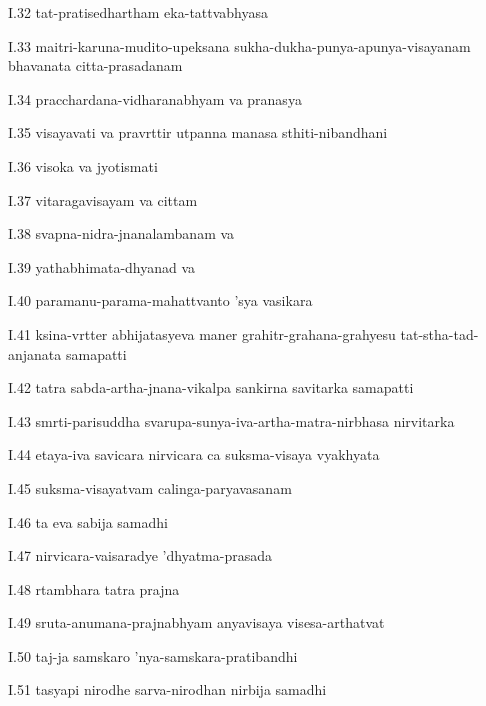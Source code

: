 I.32
tat-pratisedhartham eka-tattvabhyasa

I.33
maitri-karuna-mudito-upeksana sukha-dukha-punya-apunya-visayanam 
bhavanata citta-prasadanam

I.34
pracchardana-vidharanabhyam va pranasya

I.35
visayavati va pravrttir utpanna manasa sthiti-nibandhani

I.36
visoka va jyotismati

I.37
vitaragavisayam va cittam

I.38
svapna-nidra-jnanalambanam va

I.39
yathabhimata-dhyanad va

I.40
paramanu-parama-mahattvanto 'sya vasikara

I.41
ksina-vrtter abhijatasyeva maner 
grahitr-grahana-grahyesu tat-stha-tad-anjanata samapatti

I.42
tatra sabda-artha-jnana-vikalpa sankirna savitarka samapatti

I.43
smrti-parisuddha svarupa-sunya-iva-artha-matra-nirbhasa nirvitarka

I.44
etaya-iva savicara nirvicara ca suksma-visaya vyakhyata

I.45
suksma-visayatvam calinga-paryavasanam

I.46
ta eva sabija samadhi

I.47
nirvicara-vaisaradye 'dhyatma-prasada

I.48
rtambhara tatra prajna

I.49
sruta-anumana-prajnabhyam anyavisaya visesa-arthatvat

I.50
taj-ja samskaro 'nya-samskara-pratibandhi

I.51
tasyapi nirodhe sarva-nirodhan nirbija samadhi

